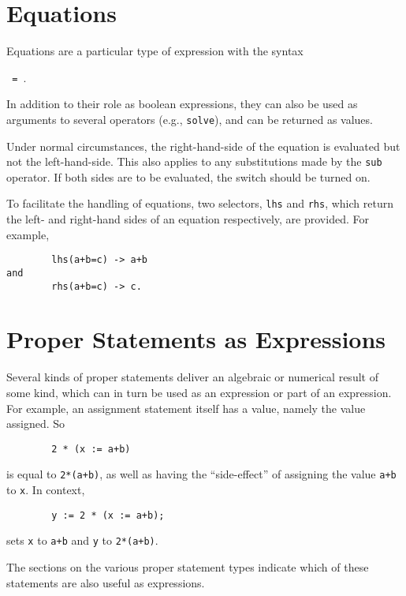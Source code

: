 \section{Equations}

Equations are a particular type of expression with the syntax
\begin{syntax}
      \texttt{ = }.
\end{syntax}
In addition to their role as boolean expressions, they can also be used as
arguments to several operators (e.g., \texttt{solve}), and can be
returned as values.

\hypertarget{switch:EVALLHSEQP}{}
Under normal circumstances, the right-hand-side of the equation is
evaluated but not the left-hand-side.  This also applies to any substitutions
made by the \texttt{sub} operator.  If both sides are to be
evaluated, the switch  should be
turned on.

\hypertarget{operator:LHS}{}
\hypertarget{operator:RHS}{}
To facilitate the handling of equations, two selectors, \texttt{lhs}
 and \texttt{rhs}, which return the left- and
right-hand sides of an equation respectively, are provided.
For example,
\begin{verbatim}
        lhs(a+b=c) -> a+b
and
        rhs(a+b=c) -> c.
\end{verbatim}

\section{Proper Statements as Expressions}

Several kinds of proper statements deliver
an algebraic or numerical result of some kind, which can in turn be used as
an expression or part of an expression.  For example, an assignment
statement itself has a value, namely the value assigned.  So
\begin{verbatim}
        2 * (x := a+b)
\end{verbatim}
is equal to \texttt{2*(a+b)}, as well as having the ``side-effect'' of assigning the value \texttt{a+b} to \texttt{x}.  In context,
\begin{verbatim}
        y := 2 * (x := a+b);
\end{verbatim}
sets \texttt{x} to \texttt{a+b} and \texttt{y} to \texttt{2*(a+b)}.

The sections on the various proper statement types
indicate which of these statements are also useful as expressions.
